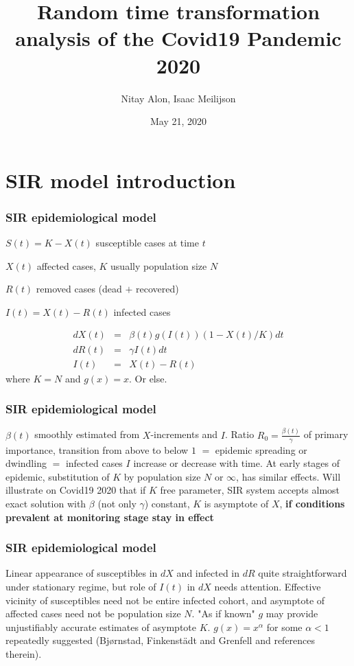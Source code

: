 \documentclass[notes]{beamer}
\title{Random time transformation analysis of the Covid19 Pandemic 2020}
\author{
Nitay Alon,
Isaac Meilijson
}
\institute{Israel Statistical Association \\
Virtual workshop on statistical aspects of the SARS-CoV-2 pandemic}
\date{May 21, 2020}
\begin{document}
\frame{\titlepage}
\section{SIR model introduction}
\begin{frame}
    \frametitle{SIR epidemiological model}
	\noindent $S(t) = K - X(t)$ susceptible cases at time $t$ 

    \noindent $X(t)$ affected cases, $K$ usually population size $N$

    \noindent $R(t)$ removed cases (dead $+$ recovered)

    \noindent $I(t)=X(t)-R(t)$ infected cases

    \begin{eqnarray}
    dX(t) & = & \beta(t) g(I(t)) (1 - X(t)/K) dt \nonumber \\
    dR(t) & = & \gamma I(t) \nonumber dt \\
    I(t) & = & X(t)-R(t) \nonumber
    \end{eqnarray}
where $K=N$ and $g(x)=x$. Or else.
\end{frame}
\begin{frame}
    \frametitle{SIR epidemiological model}
	\noindent $\beta(t)$ smoothly estimated from $X$-increments and $I$.
    \noindent Ratio $R_0=\frac{\beta(t)}{\gamma}$ of primary importance, transition from above to below $1$ $=$ epidemic spreading or dwindling $=$ infected cases $I$ increase or decrease with time.
    \noindent At early stages of epidemic, substitution of $K$ by population size $N$ or $\infty$, has similar effects. 
    \noindent Will illustrate on Covid19 2020 that if $K$ free parameter, SIR system accepts almost exact solution with $\beta$ (not only $\gamma$) constant, $K$ is asymptote of $X$, {\bf if conditions prevalent at monitoring stage stay in effect}
\end{frame}
\begin{frame}
    \frametitle{SIR epidemiological model}
	\noindent Linear appearance of susceptibles in $dX$ and infected in $dR$ quite straightforward under stationary regime, but role of $I(t)$ in $dX$ needs attention. Effective vicinity of susceptibles need not be entire infected cohort, and asymptote of affected cases need not be population size $N$.
    \noindent "As if known" $g$ may provide unjustifiably accurate estimates of asymptote $K$. $g(x)=x^\alpha$ for some  $\alpha<1$ repeatedly suggested (Bj{\o}rnstad, Finkenst\"{a}dt and Grenfell and references therein).
\end{frame}
\end{document}

